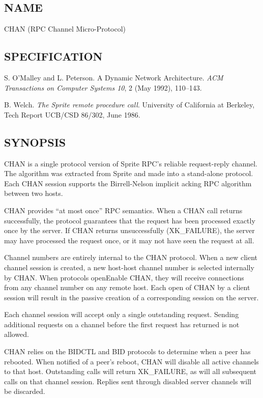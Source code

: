 %
%
%

\subsection*{NAME}

\noindent CHAN (RPC Channel Micro-Protocol)

\subsection*{SPECIFICATION}

\noindent 
S. O'Malley and L. Peterson.  A Dynamic Network Architecture.  {\it
ACM Transactions on Computer Systems 10}, 2 (May 1992), 110--143.

\medskip
\noindent  B. Welch. {\it The Sprite remote procedure call}. 
University of California at Berkeley, Tech Report UCB/CSD 86/302,
June 1986.

\subsection*{SYNOPSIS}

\noindent CHAN is a single protocol version of Sprite RPC's reliable
request-reply channel. The algorithm was extracted from Sprite and
made into a stand-alone protocol. Each CHAN session supports the
Birrell-Nelson implicit acking RPC algorithm between two hosts.

CHAN provides ``at most once'' RPC semantics.  When a CHAN call
returns successfully, the protocol guarantees that the request has
been processed exactly once by the server.  If CHAN returns
unsuccessfully (XK\_FAILURE), the server may have processed the
request once, or it may not have seen the request at all.  

Channel numbers are entirely internal to the CHAN protocol.  When a
new client channel session is created, a new host-host channel number
is selected internally by CHAN.  When protocols openEnable CHAN, they
will receive connections from any channel number on any remote host.  
Each open of CHAN by a client session will result in the passive
creation of a corresponding session on the server.

Each channel session will accept only a single outstanding request.
Sending additional requests on a channel before the first request has
returned is not allowed. 

CHAN relies on the BIDCTL and BID protocols to determine when a peer
has rebooted.  When notified of a peer's reboot, CHAN will disable all
active channels to that host.  Outstanding calls will return
XK\_FAILURE, as will all subsequent calls on that channel session.
Replies sent through disabled server channels will be discarded.

